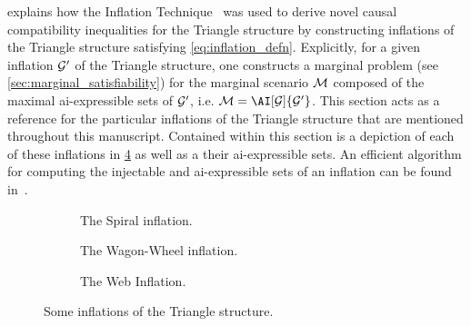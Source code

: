 \documentclass[aps, 10pt, english, twoside, pra, nofootinbib, tightenlines, longbibliography, superscriptaddress]{revtex4-1}
\begin{document}
     explains how the Inflation Technique~\cite{Inflation} was used to derive novel causal compatibility inequalities for the Triangle structure by constructing inflations of the Triangle structure satisfying \cref{eq:inflation_defn}. Explicitly, for a given inflation $\mathcal{G}'$ of the Triangle structure, one constructs a marginal problem (see \cref{sec:marginal_satisfiability}) for the marginal scenario $\mathcal{M}$ composed of the maximal ai-expressible sets of $\mathcal{G}'$, i.e. $\mscenario = \AI[\graph]{\graph'}$. This section acts as a reference for the particular inflations of the Triangle structure that are mentioned throughout this manuscript. Contained within this section is a depiction of each of these inflations in \cref{fig:inflations} as well as a their ai-expressible sets. An efficient algorithm for computing the injectable and ai-expressible sets of an inflation can be found in~\cite{Inflation}.
    \begin{center}
    \begin{figure}
    \begin{subfigure}[b]{.30\linewidth}
    \scalebox{0.65}{}
    \caption{The Spiral inflation.}\label{fig:spiral_inflation}
    \end{subfigure}
    \begin{subfigure}[b]{.30\linewidth}
    \scalebox{0.65}{}
    \caption{The Wagon-Wheel inflation.}\label{fig:wagon_wheel_inflation}
    \end{subfigure}
    \begin{subfigure}[b]{.30\linewidth}
    \scalebox{0.65}{}
    \caption{The Web Inflation.}\label{fig:the_web_inflation}
    \end{subfigure}
    \caption{Some inflations of the Triangle structure.}
    \label{fig:inflations}
    \end{figure}
    \end{center}
\end{document}
